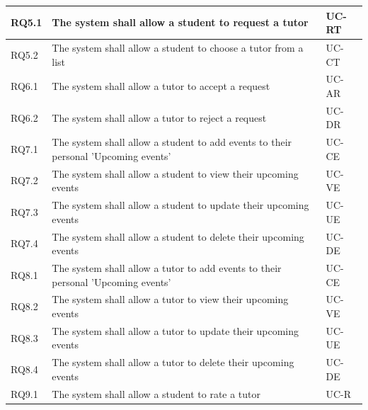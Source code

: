 \documentclass[12pt]{article}
\begin{document}
{\begin{longtable}{| l | p{10cm}| l |}
				RQ5.1 & The system shall allow a student to request a tutor & UC-RT \\ \hline
				RQ5.2 & The system shall allow a student to choose a tutor from a list & UC-CT \\ \hline

				RQ6.1 & The system shall allow a tutor to accept a request & UC-AR \\ \hline
				RQ6.2 & The system shall allow a tutor to reject a request & UC-DR \\ \hline
		

				RQ7.1 & The system shall allow a student to add events to their personal 'Upcoming events'  & UC-CE \\ \hline	
				RQ7.2 & The system shall allow a student to view their upcoming events & UC-VE \\ \hline
				RQ7.3 & The system shall allow a student to update their upcoming events & UC-UE \\ \hline
				RQ7.4 & The system shall allow a student to delete their upcoming events & UC-DE\\ \hline
				
				RQ8.1 & The system shall allow a tutor to add events to their personal 'Upcoming events'  & UC-CE \\ \hline	
				RQ8.2 & The system shall allow a tutor to view their upcoming events & UC-VE \\ \hline
				RQ8.3 & The system shall allow a tutor to update their upcoming events & UC-UE \\ \hline
				RQ8.4 & The system shall allow a tutor to delete their upcoming events & UC-DE\\ \hline
								
				RQ9.1 & The system shall allow a student to rate a tutor & UC-R\\ \hline


\end{longtable}}
\end{document}
